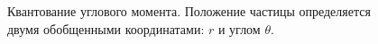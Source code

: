 \begin{figure}
\centering



\caption{Квантование углового момента. Положение частицы определяется
  двумя обобщенными координатами: $r$ и углом $\theta$.}
\label{figAddQuantAngleMoment}
\end{figure}
